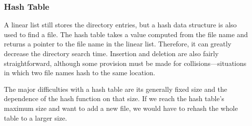 \subsubsection{Hash Table}\label{subsubsec:Hash_Table_Directory}
A linear list still stores the directory entries, but a hash data structure is also used to find a file.
The hash table takes a value computed from the file name and returns a pointer to the file name in the linear list.
Therefore, it can greatly decrease the directory search time.
Insertion and deletion are also fairly straightforward, although some provision must be made for collisions—situations in which two file names hash to the same location.

The major difficulties with a hash table are its generally fixed size and the
dependence of the hash function on that size.
If we reach the hash table's maximum size and want to add a new file, we would have to rehash the whole table to a larger size.


